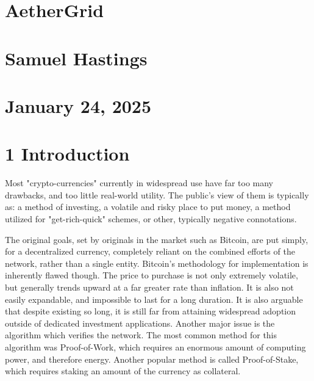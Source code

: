 \documentclass[12pt,english]{article}
\begin{document}
\begin{title}

\centering

\section*{\LARGE{AetherGrid}}
\normalsize{} 
{} 

\section*{\large{Samuel Hastings}}
\normalsize{} 
{} 

\section*{\large{January 24, 2025}}
\normalsize{} 
{} 



\end{title}

\noindent \vspace{5mm} %

\section*{\huge{1 Introduction}}
\normalsize{} 



Most "crypto-currencies" currently in widespread use have far too many drawbacks, and too little real-world utility. The public's view of them is typically as: a method of investing, a volatile and risky place to put money, a method utilized for "get-rich-quick" schemes, or other, typically negative connotations.


The original goals, set by originals in the market such as Bitcoin, are put simply, for a decentralized currency, completely reliant on the combined efforts of the network, rather than a single entity. Bitcoin's methodology for implementation is inherently flawed though. The price to purchase is not only extremely volatile, but generally trends upward at a far greater rate than inflation. It is also not easily expandable, and impossible to last for a long duration. It is also arguable that despite existing so long, it is still far from attaining widespread adoption outside of dedicated investment applications. Another major issue is the algorithm which verifies the network. The most common method for this algorithm was Proof-of-Work, which requires an enormous amount of computing power, and therefore energy. Another popular method is called Proof-of-Stake, which requires staking an amount of the currency as collateral.
\end{document}
